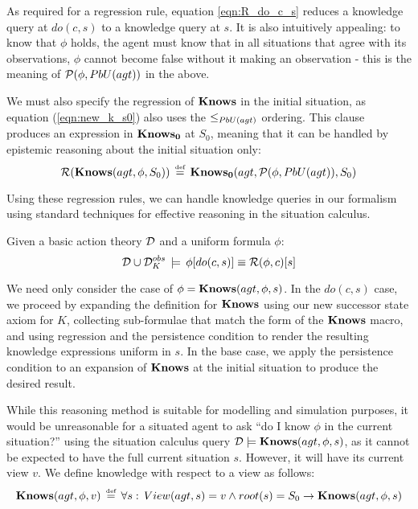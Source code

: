 As required for a regression rule, equation \eqref{eqn:R_do_c_s}
reduces a knowledge query at $do(c,s)$ to a knowledge query at $s$.
It is also intuitively appealing: to know that $\phi$ holds, the
agent must know that in all situations that agree with its observations,
$\phi$ cannot become false without it making an observation - this
is the meaning of $\mathcal{P}(\phi,PbU(agt))$ in the above.

We must also specify the regression of $\mathbf{Knows}$ in the initial situation,
as equation (\ref{eqn:new_k_s0}) also uses the $\leq_{PbU(agt)}$
ordering. This clause produces an expression in $\mathbf{Knows_{0}}$ at $S_{0}$,
meaning that it can be handled by epistemic reasoning about the initial
situation only:\begin{equation}
\mathcal{R}(\mathbf{Knows}(agt,\phi,S_{0}))\,\stackrel{\mbox{\tiny def}}{=}\,\mathbf{Knows_{0}}(agt,\mathcal{P}(\phi,PbU(agt)),S_{0})\label{eqn:R_s0}\end{equation}


Using these regression rules, we can handle knowledge queries in our
formalism using standard techniques for effective reasoning in the
situation calculus.

\begin{thm}
\label{thm:Reg_Knows}Given a basic action theory $\mathcal{D}$ and a uniform
formula $\phi$:\[
\mathcal{D}\cup\mathcal{D}_{K}^{obs}\,\models\,\phi[do(c,s)]\equiv\mathcal{R}(\phi,c)[s]\]

\end{thm}
\begin{proofsketch}
We need only consider the case of $\phi=\mathbf{Knows}(agt,\phi,s)$. In the
$do(c,s)$ case, we proceed by expanding the definition for $\mathbf{Knows}$
using our new successor state axiom for $K$, collecting sub-formulae
that match the form of the $\mathbf{Knows}$ macro, and using regression and
the persistence condition to render the resulting knowledge expressions
uniform in $s$. In the base case, we apply the persistence condition
to an expansion of $\mathbf{Knows}$ at the initial situation to produce the
desired result. 
\end{proofsketch}
While this reasoning method is suitable for modelling and simulation
purposes, it would be unreasonable for a situated agent to ask {}``do
I know $\phi$ in the current situation?'' using the situation calculus
query $\mathcal{D}\models\mathbf{Knows}(agt,\phi,s)$, as it cannot be expected
to have the full current situation $s$. However, it will have its
current view $v$. We define knowledge with respect to a view as follows:\[
\mathbf{Knows}(agt,\phi,v)\,\stackrel{\mbox{\tiny def}}{=}\,\forall s:\, View(agt,s)=v\wedge root(s)=S_{0}\rightarrow\mathbf{Knows}(agt,\phi,s)\]


